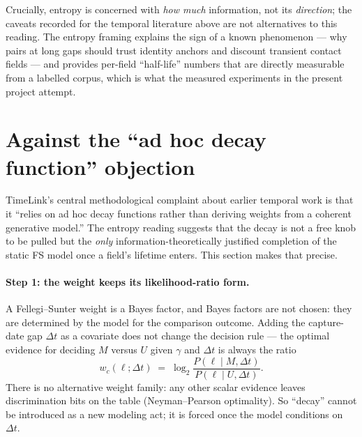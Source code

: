 \documentclass[11pt]{article}
\newcommand{\dt}{\Delta t}
\begin{document}
\noindent Crucially, entropy is concerned with \emph{how much} information, not its
\emph{direction}; the caveats recorded for the temporal literature above are not
alternatives to this reading. The entropy framing explains the sign of a known
phenomenon --- why pairs at long gaps should trust identity anchors and discount transient
contact fields --- and provides per-field ``half-life'' numbers that are directly
measurable from a labelled corpus, which is what the measured experiments in the present
project attempt.

\section{Against the ``ad hoc decay function'' objection}

TimeLink's central methodological complaint about earlier temporal work is that it
``relies on ad hoc decay functions rather than deriving weights from a coherent
generative model.'' The entropy reading suggests that the decay is not a free knob to
be pulled but the \emph{only} information-theoretically justified completion of the
static FS model once a field's lifetime enters. This section makes that precise.

\paragraph{Step 1: the weight keeps its likelihood-ratio form.}
A Fellegi--Sunter weight is a Bayes factor, and Bayes factors are not chosen: they are
determined by the model for the comparison outcome. Adding the capture-date gap $\dt$
as a covariate does not change the decision rule --- the optimal evidence for deciding
$M$ versus $U$ given $\gamma$ and $\dt$ is always the ratio
\begin{equation}
  w_c(\ell;\dt) \;=\; \log_2\frac{P(\ell \mid M,\dt)}{P(\ell \mid U,\dt)}.
  \label{eq:llr-time}
\end{equation}
There is no alternative weight family: any other scalar evidence leaves
discrimination bits on the table (Neyman--Pearson optimality). So ``decay'' cannot be
introduced as a new modeling act; it is forced once the model conditions on $\dt$.
\end{document}
